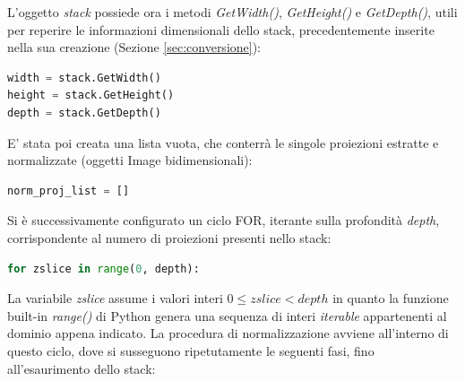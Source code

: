 \documentclass[a4paper,12pt, doubleside]{report}
\begin{document}
                L'oggetto \textit{stack} possiede ora i metodi \textit{GetWidth()}, \textit{GetHeight()} e \textit{GetDepth()}, utili per reperire le informazioni dimensionali dello stack, precedentemente inserite nella sua creazione (Sezione \ref{sec:conversione}):
                \begin{lstlisting}[language=python, frame=bt]
width = stack.GetWidth()
height = stack.GetHeight()
depth = stack.GetDepth()
                \end{lstlisting} 
                
                E' stata poi creata una lista vuota, che conterrà le singole proiezioni estratte e normalizzate (oggetti Image bidimensionali):
                \begin{lstlisting}[language=python, frame=bt]
norm_proj_list = []
                \end{lstlisting}
                
                Si è successivamente configurato un ciclo FOR, iterante sulla profondità \textit{depth}, corrispondente al numero di proiezioni presenti nello stack:
                \begin{lstlisting}[language=python, frame=bt]
for zslice in range(0, depth):
                \end{lstlisting} 

                La variabile \textit{zslice} assume i valori interi $0 \leq zslice < depth$ in quanto la funzione built-in \textit{range()} \cite{python-range} di Python genera una sequenza di interi \textit{iterable} \cite{python-iterable} appartenenti al dominio appena indicato. La procedura di normalizzazione avviene all'interno di questo ciclo, dove si susseguono ripetutamente le seguenti fasi, fino all'esaurimento dello stack:
                
\end{document}
